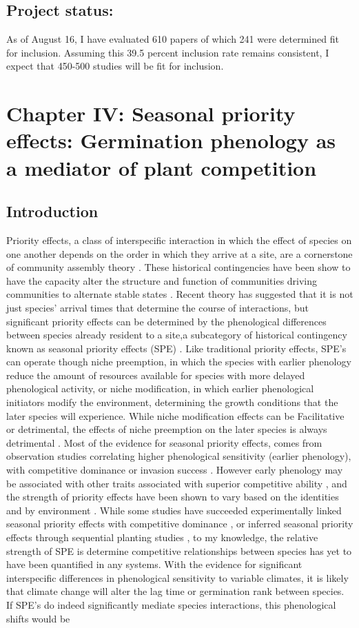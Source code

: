\documentclass{article}\usepackage[]{graphicx}\usepackage[]{color}
\begin{document}
\subsection*{Project status:}
As of August 16, I have evaluated 610 papers of which 241 were determined fit for inclusion. Assuming this 39.5 percent inclusion rate remains consistent, I expect that 450-500 studies will be fit for inclusion.
\section*{Chapter IV: Seasonal priority effects: Germination phenology as a mediator of plant competition}
\subsection*{Introduction}
\indent\indent Priority effects, a class of interspecific interaction in which the effect of species on one another depends on the order in which they arrive at a site, are a cornerstone of community assembly theory \citep{Fukami2015}. These historical contingencies have been show to have the capacity alter the structure and function of communities driving communities to alternate stable states \citep{Fukami2011}. Recent theory has suggested that it is not just species' arrival times that determine the course of interactions, but significant priority effects can be determined by the phenological differences between species already resident to a site,a subcategory of historical contingency known as seasonal priority effects (SPE) \citep{Wainwright2012}. Like traditional priority effects, SPE's can operate though niche preemption, in which the species with earlier phenology reduce the amount of resources available for species with more delayed phenological activity, or niche modification, in which earlier phenological initiators modify the environment, determining the growth conditions that the later species will experience. While niche modification effects can be Facilitative or detrimental, the effects of niche preemption on the later species is always detrimental \citep{Fukami2015}. Most of the evidence for seasonal priority effects, comes from observation studies correlating higher phenological sensitivity (earlier phenology), with competitive dominance or invasion success \citep{Gioria2018}. However early phenology may be associated with other traits associated with superior competitive ability \citep{Dickson2012}, and the strength of priority effects have been shown to vary based on the identities \citep{Cleland2015} and by environment \citep{Kardol2013}.  While some studies have succeeded experimentally linked seasonal priority effects with competitive dominance \citep{Wainwright2012}, or inferred seasonal priority effects through sequential planting studies \citep{Korner2008}, to my knowledge, the relative strength of SPE is determine competitive relationships between species has yet to have been quantified in any systems. With the evidence for significant interspecific differences in phenological sensitivity to variable climates, it is likely that climate change will alter the lag time or germination rank between species. If SPE's do indeed significantly mediate species interactions, this phenological shifts would be 
\end{document}
